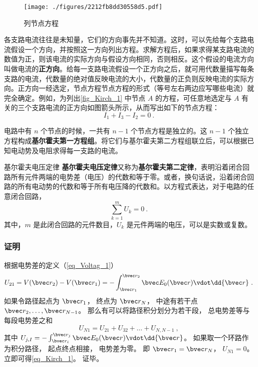 \begin{example}{}

\begin{figure}[ht]
\centering
\texttt{[image: ./figures/2212fb8dd30558d5.pdf]}
\caption{列节点方程} \label{fig_Kirch_1}
\end{figure}
各支路电流往往是未知量，它们的方向事先并不知道。这时，可以先给每个支路电流假设一个方向，并按照这一方向列出方程。求解方程后，如果求得某支路电流的数值为正，则该电流的实际方向与假设方向相同，否则相反。这个假设的电流方向叫做电流的\textbf{正方向}。给每一支路电流假设一个正方向之后，就可用代数量描写每条支路的电流，代数量的绝对值反映电流的大小，代数量的正负则反映电流的实际方向。正方向一经选定，节点方程节点方程的形式（等号左右两边应写哪些电流）就完全确定。例如，为列出\autoref{fig_Kirch_1} 中节点 $A$ 的方程，可任意地选定与 $A $ 有关的三个支路电流的正方向如图箭头所示，从而写出如下的节点方程：
\begin{equation}
I_1+I_3-I_2=0~.
\end{equation}
\end{example}
电路中有 $n$ 个节点的时候，一共有 $n-1$ 个节点方程是独立的。这 $n-1$ 个独立方程构成\textbf{基尔霍夫第一方程组}。将它们与基尔霍夫第二方程组联立后，可以根据已知电动势及电阻求得每一支路的电流。

\begin{theorem}{基尔霍夫电压定律}
\textbf{基尔霍夫电压定律}又称为\textbf{基尔霍夫第二定律}，表明沿着闭合回路所有元件两端的电势差（电压）的代数和等于零。或者，换句话说，沿着闭合回路的所有电动势的代数和等于所有电压降的代数和。以方程式表达，对于电路的任意闭合回路，
\begin{equation}\label{eq_Kirch_1}
\sum_{k=1}^m U_k = 0~.
\end{equation}
其中，$m$ 是此闭合回路的元件数目，$U_k$ 是元件两端的电压，可以是实数或复数。
\end{theorem}

\subsubsection{证明}
根据电势差的定义（\autoref{eq_Voltag_1}）
\begin{equation}
U_{21} = V(\bvec r_2) - V(\bvec r_1) = - \int_{\bvec r_1}^{\bvec r_2} \bvec E_0(\bvec r) \vdot \dd{\bvec r}~.
\end{equation}
如果令路径起点为 $\bvec r_1$， 终点为 $\bvec r_N$， 中途有若干点 $\bvec r_2, \dots, \bvec r_{N-1}$。 那么有可以将路径积分划分为若干段， 总电势差等与每段电势差之和
\begin{equation}
U_{N1} = U_{21} + U_{32} + \dots + U_{N, N-1}~,
\end{equation}
其中 $U_{j, I} = - \int_{\bvec r_i}^{\bvec r_{j}} \bvec E_0(\bvec r) \vdot \dd{\bvec r}$。
如果取一个环路作为积分路径， 起点终点相接， 电势差为零。 即 $\bvec r_1 = \bvec r_N$， $U_{N1} = 0$。 立即可得\autoref{eq_Kirch_1}。 证毕。


